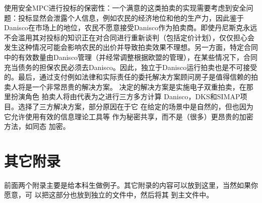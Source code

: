 使用安全MPC进行投标的保密性：一个满意的这类拍卖的实现需要考虑到安全问题：投标显然会泄露个人信息，例如农民的经济地位和他的生产力，因此鉴于Danisco在市场上的地位，农民不愿意接受Danisco作为拍卖商。即使丹尼斯克永远不会滥用其对投标的知识正在对合同进行重新谈判（包括定价计划），仅仅担心会发生这种情况可能会影响农民的出价并导致拍卖效果不理想。另一方面，特定合同中的有效数量由Danisco管理（并经常调整根据欧盟的管理），在某些情况下，合同充当债务的担保农民必须去Danisco。因此，独立于Danisco运行拍卖也是不可接受的。最后，通过支付例如法律和实际责任的委托解决方案顾问房子是值得信赖的拍卖人将是一个非常昂贵的解决方案。
决定的解决方案是实施电子双重拍卖，在那里扮演角色
拍卖人将由代表为之进行三方多方计算
Danisco，DKS和SIMAP项目。选择了三方解决方案，部分原因在于它
在给定的场景中是自然的，但也因为它允许使用有效的信息理论工具等
作为秘密共享，而不是（很多）更昂贵的加密方法，如同态
加密。


\chapter{其它附录}
前面两个附录主要是给本科生做例子。其它附录的内容可以放到这里，当然如果你愿意，可
以把这部分也放到独立的文件中，然后将其  到主文件中。
